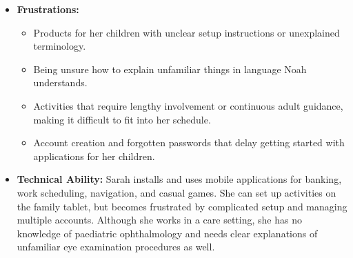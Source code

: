 \documentclass[10pt]{article}
\begin{document}
\begin{itemize}
\item \textbf{Frustrations:}
\begin{itemize}
    \item Products for her children with unclear setup instructions or unexplained terminology.
    \item Being unsure how to explain unfamiliar things in language
    Noah understands.
    \item Activities that require lengthy involvement or continuous adult
    guidance, making it difficult to fit into her schedule.
    \item Account creation and forgotten passwords that delay getting started
    with applications for her children.
\end{itemize}

\item \textbf{Technical Ability:} Sarah installs and uses
mobile applications for banking, work scheduling, navigation, and casual
games. She can set up activities on the family tablet, but becomes frustrated
by complicated setup and managing multiple accounts. Although she
works in a care setting, she has no knowledge of paediatric
ophthalmology and needs clear explanations of unfamiliar eye examination
procedures as well.
\end{itemize}
\end{document}
